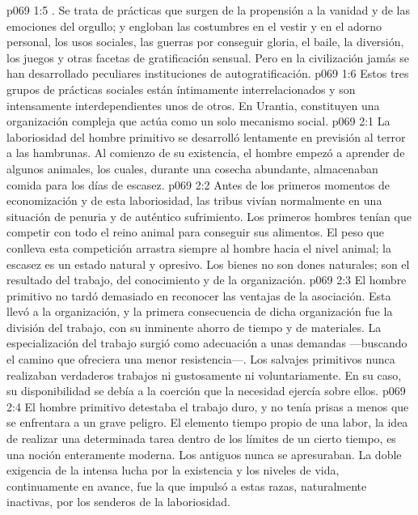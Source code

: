 \vs p069 1:5 . Se trata de prácticas que surgen de la propensión a la vanidad y de las emociones del orgullo; y engloban las costumbres en el vestir y en el adorno personal, los usos sociales, las guerras por conseguir gloria, el baile, la diversión, los juegos y otras facetas de gratificación sensual. Pero en la civilización jamás se han desarrollado peculiares instituciones de autogratificación.
\vs p069 1:6 \pc Estos tres grupos de prácticas sociales están íntimamente interrelacionados y son intensamente interdependientes unos de otros. En Urantia, constituyen una organización compleja que actúa como un solo mecanismo social.
\vs p069 2:1 La laboriosidad del hombre primitivo se desarrolló lentamente en previsión al terror a las hambrunas. Al comienzo de su existencia, el hombre empezó a aprender de algunos animales, los cuales, durante una cosecha abundante, almacenaban comida para los días de escasez.
\vs p069 2:2 Antes de los primeros momentos de economización y de esta laboriosidad, las tribus vivían normalmente en una situación de penuria y de auténtico sufrimiento. Los primeros hombres tenían que competir con todo el reino animal para conseguir sus alimentos. El peso que conlleva esta competición arrastra siempre al hombre hacia el nivel animal; la escasez es un estado natural y opresivo. Los bienes no son dones naturales; son el resultado del trabajo, del conocimiento y de la organización.
\vs p069 2:3 El hombre primitivo no tardó demasiado en reconocer las ventajas de la asociación. Esta llevó a la organización, y la primera consecuencia de dicha organización fue la división del trabajo, con su inminente ahorro de tiempo y de materiales. La especialización del trabajo surgió como adecuación a unas demandas ---buscando el camino que ofreciera una menor resistencia---. Los salvajes primitivos nunca realizaban verdaderos trabajos ni gustosamente ni voluntariamente. En su caso, su disponibilidad se debía a la coerción que la necesidad ejercía sobre ellos.
\vs p069 2:4 El hombre primitivo detestaba el trabajo duro, y no tenía prisas a menos que se enfrentara a un grave peligro. El elemento tiempo propio de una labor, la idea de realizar una determinada tarea dentro de los límites de un cierto tiempo, es una noción enteramente moderna. Los antiguos nunca se apresuraban. La doble exigencia de la intensa lucha por la existencia y los niveles de vida, continuamente en avance, fue la que impulsó a estas razas, naturalmente inactivas, por los senderos de la laboriosidad.
